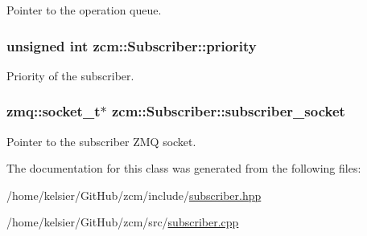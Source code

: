 Pointer to the operation queue. 

\hypertarget{classzcm_1_1Subscriber_a208baedba808c9229887ab8af00725fd}{
\subsubsection[{priority}]{\setlength{\rightskip}{0pt plus 5cm}unsigned int zcm\-::\-Subscriber\-::priority\hspace{0.3cm}{\ttfamily [private]}}}\label{classzcm_1_1Subscriber_a208baedba808c9229887ab8af00725fd}


Priority of the subscriber. 

\hypertarget{classzcm_1_1Subscriber_ab6b9ee85d97a209b7c370b90882ed028}{
\subsubsection[{subscriber\-\_\-socket}]{\setlength{\rightskip}{0pt plus 5cm}zmq\-::socket\-\_\-t$\ast$ zcm\-::\-Subscriber\-::subscriber\-\_\-socket\hspace{0.3cm}{\ttfamily [private]}}}\label{classzcm_1_1Subscriber_ab6b9ee85d97a209b7c370b90882ed028}


Pointer to the subscriber Z\-M\-Q socket. 



The documentation for this class was generated from the following files\-:\begin{DoxyCompactItemize}
\item 
/home/kelsier/\-Git\-Hub/zcm/include/\hyperlink{subscriber_8hpp}{subscriber.\-hpp}\item 
/home/kelsier/\-Git\-Hub/zcm/src/\hyperlink{subscriber_8cpp}{subscriber.\-cpp}\end{DoxyCompactItemize}
